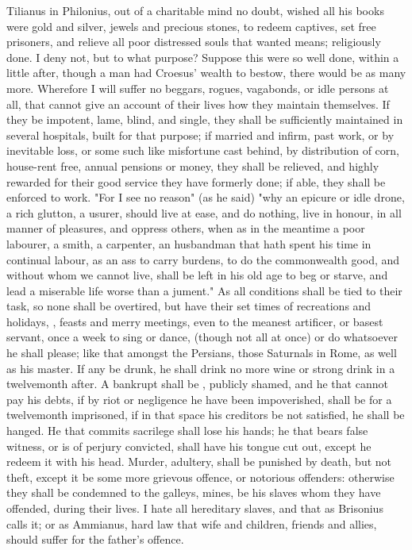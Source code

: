 Tilianus in Philonius, out of a charitable mind no doubt, wished all his books
were gold and silver, jewels and precious stones, to redeem
captives, set free prisoners, and relieve all poor distressed souls that wanted
means; religiously done. I deny not, but to what purpose? Suppose this were so
well done, within a little after, though a man had Croesus' wealth to bestow,
there would be as many more. Wherefore I will suffer no
beggars, rogues, vagabonds, or idle persons at all, that
cannot give an account of their lives how they maintain
themselves. If they be impotent, lame, blind, and single, they shall be
sufficiently maintained in several hospitals, built for that purpose; if
married and infirm, past work, or by inevitable loss, or some such like
misfortune cast behind, by distribution of corn, house-rent
free, annual pensions or money, they shall be relieved, and highly rewarded for
their good service they have formerly done; if able, they shall be enforced to
work. "For I see no reason" (as he
said) "why an epicure or idle drone, a rich glutton, a usurer, should live at
ease, and do nothing, live in honour, in all manner of pleasures, and oppress
others, when as in the meantime a poor labourer, a smith, a carpenter, an
husbandman that hath spent his time in continual labour, as an ass to carry
burdens, to do the commonwealth good, and without whom we cannot live, shall be
left in his old age to beg or starve, and lead a miserable life worse than a
jument." As all conditions shall be tied to their task, so
none shall be overtired, but have their set times of recreations and holidays,
, feasts and merry meetings, even to the meanest artificer,
or basest servant, once a week to sing or dance, (though not all at once) or do
whatsoever he shall please; like that 
amongst the Persians, those Saturnals in Rome, as well as his master.
If any be drunk, he shall drink no more wine or strong
drink in a twelvemonth after. A bankrupt shall be
, publicly shamed, and he
that cannot pay his debts, if by riot or negligence he have been impoverished,
shall be for a twelvemonth imprisoned, if in that space his creditors be not
satisfied, he shall be hanged. He that
commits sacrilege shall lose his hands; he that bears false witness, or is of
perjury convicted, shall have his tongue cut out, except he redeem it with his
head. Murder, adultery, shall be punished by death,
but not theft, except it be some more grievous offence, or
notorious offenders: otherwise they shall be condemned to the galleys, mines,
be his slaves whom they have offended, during their lives. I hate all
hereditary slaves, and that  as
Brisonius calls it; or as Ammianus,
 hard law that wife and children, friends and allies, should
suffer for the father's offence.

